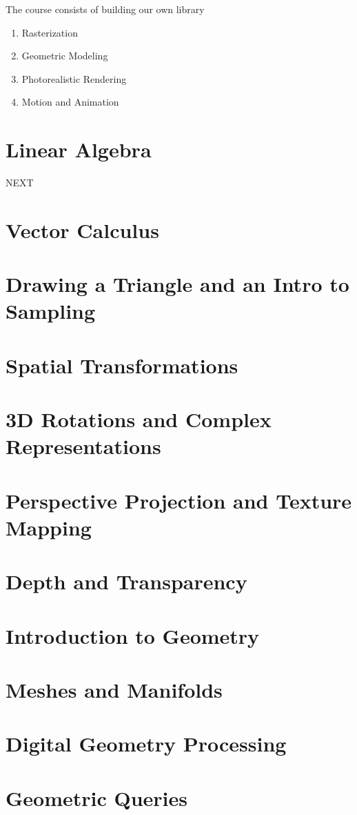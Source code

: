 \documentclass{article}
\begin{document}
The course consists of building our own library
\begin{enumerate}
    \item Rasterization
    \item Geometric Modeling
    \item Photorealistic Rendering
    \item Motion and Animation
\end{enumerate}

\section{Linear Algebra}

NEXT

\section{Vector Calculus}
\section{Drawing a Triangle and an Intro to Sampling}
\section{Spatial Transformations}
\section{3D Rotations and Complex Representations}
\section{Perspective Projection and Texture Mapping}
\section{Depth and Transparency}
\section{Introduction to Geometry}
\section{Meshes and Manifolds}
\section{Digital Geometry Processing}
\section{Geometric Queries}
\end{document}
